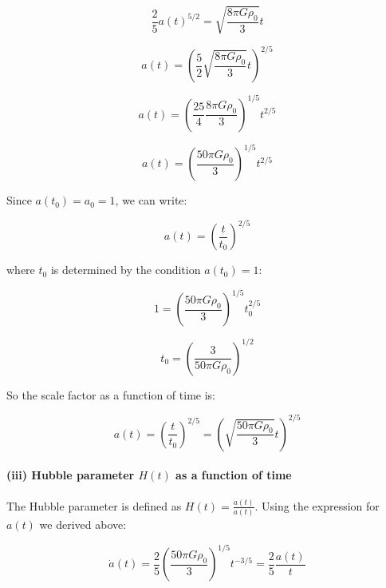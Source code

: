 \documentclass{article}
\begin{document}
\begin{equation}
\frac{2}{5}a(t)^{5/2} = \sqrt{\frac{8\pi G \rho_0}{3}} t
\end{equation}

\begin{equation}
a(t) = \left(\frac{5}{2}\sqrt{\frac{8\pi G \rho_0}{3}} t\right)^{2/5}
\end{equation}

\begin{equation}
a(t) = \left(\frac{25}{4}\frac{8\pi G \rho_0}{3}\right)^{1/5} t^{2/5}
\end{equation}

\begin{equation}
a(t) = \left(\frac{50\pi G \rho_0}{3}\right)^{1/5} t^{2/5}
\end{equation}

Since $a(t_0) = a_0 = 1$, we can write:

\begin{equation}
a(t) = \left(\frac{t}{t_0}\right)^{2/5}
\end{equation}

where $t_0$ is determined by the condition $a(t_0) = 1$:

\begin{equation}
1 = \left(\frac{50\pi G \rho_0}{3}\right)^{1/5} t_0^{2/5}
\end{equation}

\begin{equation}
t_0 = \left(\frac{3}{50\pi G \rho_0}\right)^{1/2}
\end{equation}

So the scale factor as a function of time is:

\begin{equation}
a(t) = \left(\frac{t}{t_0}\right)^{2/5} = \left(\sqrt{\frac{50\pi G \rho_0}{3}} t\right)^{2/5}
\end{equation}

\paragraph{(iii) Hubble parameter $H(t)$ as a function of time}

The Hubble parameter is defined as $H(t) = \frac{\dot{a}(t)}{a(t)}$. Using the expression for $a(t)$ we derived above:

\begin{equation}
\dot{a}(t) = \frac{2}{5} \left(\frac{50\pi G \rho_0}{3}\right)^{1/5} t^{-3/5} = \frac{2}{5} \frac{a(t)}{t}
\end{equation}
\end{document}

